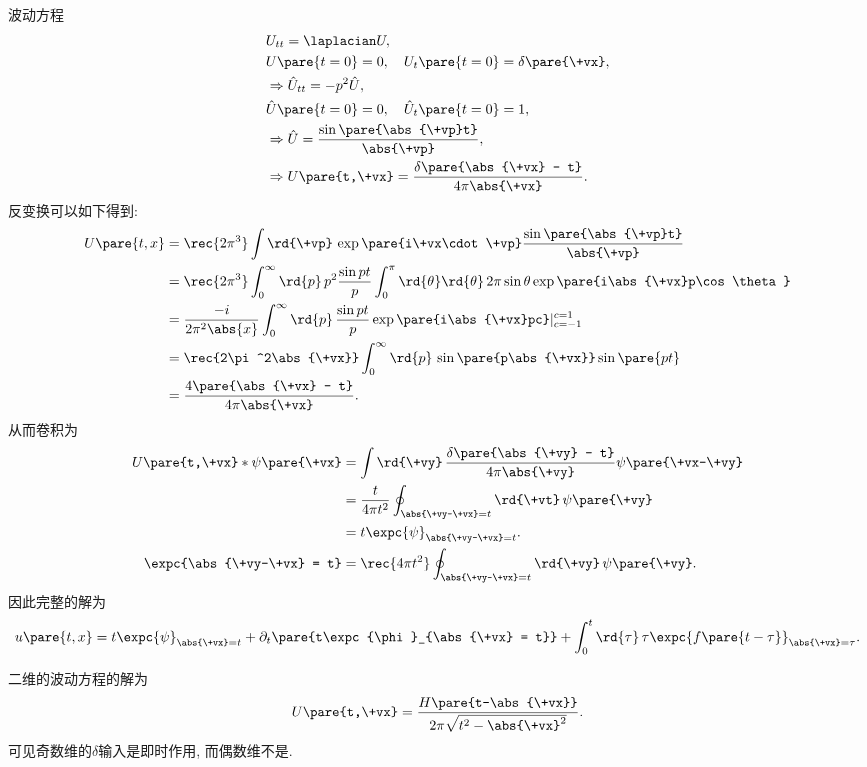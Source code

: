 \documentclass[hidelinks]{ctexart}
\begin{document}
\begin{sample}
    \begin{ex}
        波动方程
        \begin{align*}
            & U_{tt} = \laplacian U, \\
            & U\pare{t=0} = 0,\quad U_t\pare{t=0} = \delta\pare{\+vx}, \\
            & \Rightarrow \hat U_{tt} = -p^2\hat U, \\
            & \hat U\pare{t=0} = 0,\quad \hat U_t\pare{t=0} = 1, \\
            & \Rightarrow \hat U = \frac{\sin\pare{\abs{\+vp}t}}{\abs{\+vp}}, \\
            & \Rightarrow U\pare{t,\+vx} = \frac{\delta\pare{\abs{\+vx} - t}}{4\pi\abs{\+vx}}.
        \end{align*}
        反变换可以如下得到:
        \begin{align*}
            U\pare{t,x} &= \rec{2\pi^3} \int \rd{\+vp}\, \exp\pare{i\+vx\cdot \+vp} \frac{\sin\pare{\abs{\+vp}t}}{\abs{\+vp}} \\
            &= \rec{2\pi^3}\int_0^\infty \rd{p}\, p^2 \frac{\sin pt}{p} \int_0^\pi \rd{\theta} \rd{\theta}\, 2\pi \sin\theta \exp\pare{i\abs{\+vx}p\cos\theta} \\
            &= \frac{-i}{2\pi^2 \abs{x}} \int_0^\infty \rd{p}\, \frac{\sin pt}{p}\exp\pare{i\abs{\+vx}pc}\vert_{c=-1}^{c=1} \\
            &= \rec{2\pi^2\abs{\+vx}} \int_0^\infty \rd{p}\,\sin\pare{p\abs{\+vx}}\sin \pare{pt} \\
            &= \frac{4\pare{\abs{\+vx} - t}}{4\pi\abs{\+vx}}.
        \end{align*}
        从而卷积为
        \begin{align*}
            U\pare{t,\+vx} * \psi\pare{\+vx} &= \int \rd{\+vy}\, \frac{\delta\pare{\abs{\+vy} - t}}{4\pi\abs{\+vy}}\psi\pare{\+vx-\+vy} \\
            &= \frac{t}{4\pi t^2} \oint_{\abs{\+vy-\+vx} = t}\rd{\+vt}\,\psi\pare{\+vy} \\
            &= t\expc{\psi}_{\abs{\+vy-\+vx} = t}. \\
            \expc{\abs{\+vy-\+vx} = t} &= \rec{4\pi t^2}\oint_{\abs{\+vy-\+vx} = t}\rd{\+vy}\,\psi\pare{\+vy}.
        \end{align*}
        因此完整的解为
        \[ u\pare{t,x} = t\expc{\psi}_{\abs{\+vx} = t} + \partial_t \pare{t\expc{\phi}_{\abs{\+vx} = t}} + \int_0^t \rd{\tau}\,\tau \expc{f\pare{t-\tau}}_{\abs{\+vx} = \tau}. \]
    \end{ex}
\end{sample}
\begin{remark}
    二维的波动方程的解为
    \[ U\pare{t,\+vx} = \frac{H\pare{t-\abs{\+vx}}}{2\pi\sqrt{t^2 - \abs{\+vx}^2}}. \]
    可见奇数维的$\delta$输入是即时作用, 而偶数维不是.
\end{remark}


\end{document}
